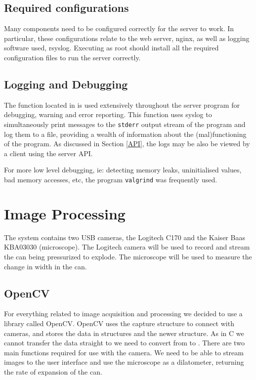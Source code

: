 \subsection{Required configurations}
Many components need to be configured correctly for the server to work. In particular, these configurations relate to the web server, nginx, as well as logging software used, rsyslog. Executing  as root should install all the required configuration files to run the server correctly.


\subsection{Logging and Debugging}

The function  located in  is used extensively throughout the server program for debugging, warning and error reporting. This function uses syslog to simultaneously print messages to the \texttt{stderr} output stream of the program and log them to a file, providing a wealth of information about the (mal)functioning of the program. As discussed in Section \ref{API}, the logs may be also be viewed by a client using the server API.

For more low level debugging, ie: detecting memory leaks, uninitialised values, bad memory accesses, etc, the program \texttt{valgrind}\cite{valgrind} was frequently used.



\section{Image Processing}\label{Image Processing}




The system contains two USB cameras, the Logitech C170\cite{logitechC170} and the Kaiser Baas KBA03030 (microscope)\cite{kaiserbaasKBA03030}.  The Logitech camera will be used to record and stream the can being pressurized to explode.  The microscope will be used to measure the change in width in the can. 

\subsection{OpenCV}

For everything related to image acquisition and processing we decided to use a library called OpenCV\cite{OpenCV}. OpenCV uses the capture structure to connect with cameras, and stores the data in  structures and the newer  structure.  As in C we cannot transfer the data straight to  we need to convert from  to .  There are two main functions required for use with the camera.  We need to be able to stream images to the user interface and use the microscope as a dilatometer, returning the rate of expansion of the can.  


